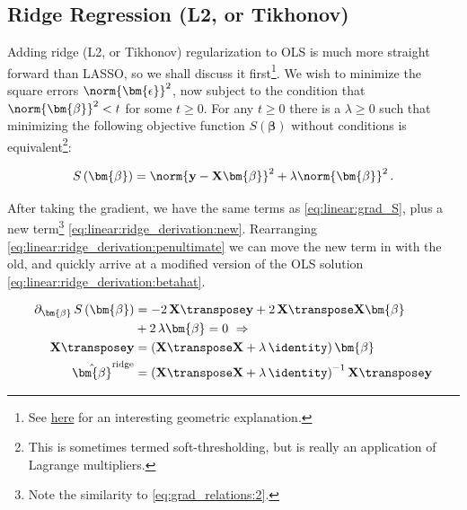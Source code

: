 \subsection{Ridge Regression (L2, or Tikhonov)}
\label{regression:linear:ridge}

Adding ridge (L2, or Tikhonov) regularization to OLS is much more straight forward than LASSO,
so we shall discuss it first\footnote{See \href{https://stats.stackexchange.com/a/164546}{here} for an interesting geometric explanation.}.
We wish to minimize the square errors $\norm{\bm{\epsilon}}^{2}$,
now subject to the condition that $\norm{\bm{\beta}}^{2} < t$ for some $t \geq 0$.
For any $t \geq 0$ there is a $\lambda \geq 0$ such that minimizing the following
objective function $S\left(\bm{\beta}\right)$ without conditions is
equivalent\footnote{This is sometimes termed soft-thresholding, but is really an application of Lagrange multipliers.}:

\begin{equation} \label{eq:linear:ridge}
S\left(\bm{\beta}\right) = \norm{\mathbf{y} - \mathbf{X} \bm{\beta}}^{2} + \lambda \norm{\bm{\beta}}^{2}\,.
\end{equation}

After taking the gradient, we have the same terms as \cref{eq:linear:grad_S},
plus a new term\footnote{Note the similarity to \cref{eq:grad_relations:2}.} \cref{eq:linear:ridge_derivation:new}.
Rearranging \cref{eq:linear:ridge_derivation:penultimate} we can move the new term in with the old,
and quickly arrive at a modified version of the OLS solution \cref{eq:linear:ridge_derivation:betahat}.

\begin{subequations} \label{eq:linear:ridge_derivation}
\begin{align}
\partial_{\bm{\beta}} \, S\left(\bm{\beta}\right)
&= -2\, \mathbf{X}\transpose \mathbf{y} + 2\, \mathbf{X}\transpose \mathbf{X} \bm{\beta} \label{eq:linear:ridge_derivation:grad_S_repeat} \\
&+ 2\,\lambda \bm{\beta} = 0 \,\, \Rightarrow \label{eq:linear:ridge_derivation:new} \\
\mathbf{X}\transpose \mathbf{y} &= \left(\mathbf{X}\transpose \mathbf{X} + \lambda\,\identity\right) \bm{\beta} \label{eq:linear:ridge_derivation:penultimate} \\
\hat{\bm{\beta}}^{\text{ridge}} &= \left(\mathbf{X}\transpose\mathbf{X} + \lambda\,\identity\right)^{-1}\mathbf{X}\transpose \mathbf{y} \label{eq:linear:ridge_derivation:betahat}
\end{align}
\end{subequations}

